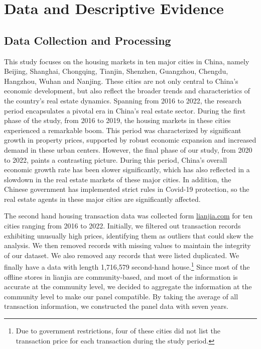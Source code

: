 \documentclass[12pt]{article}
\begin{document}


\section{Data and Descriptive Evidence \label{sec:data}}

\subsection{Data Collection and Processing} \label{subsec:data_collection}

This study focuses on the housing markets in ten major cities in China, namely Beijing, Shanghai, Chongqing, Tianjin, Shenzhen, Guangzhou, Chengdu, Hangzhou, Wuhan and Nanjing. These cities are not only central to China's economic development, but also reflect the broader trends and characteristics of the country's real estate dynamics. Spanning from 2016 to 2022, the research period encapsulates a pivotal era in China's real estate sector. During the first phase of the study, from 2016 to 2019, the housing markets in these cities experienced a remarkable boom. This period was characterized by significant growth in property prices, supported by robust economic expansion and increased demand in these urban centers. However, the final phase of our study, from 2020 to 2022, paints a contrasting picture. During this period, China's overall economic growth rate has been slower significantly, which has also reflected in a slowdown in the real estate markets of these major cities. In addition, the Chinese government has implemented strict rules in Covid-19 protection, so the real estate agents in these major cities are significantly affected.

The second hand housing transaction data was collected form \href{https://bj.lianjia.com/}{lianjia.com} for ten cities ranging from 2016 to 2022. Initially, we filtered out transaction records exhibiting unusually high prices, identifying them as outliers that could skew the analysis. We then removed records with missing values to maintain the integrity of our dataset. We also removed any records that were listed duplicated. We finally have a data with length 1,716,579 second-hand house.\footnote{Due to government restrictions, four of these cities did not list the transaction price for each transaction during the study period.} Since most of the offline stores in lianjia are community-based, and most of the information is accurate at the community level, we decided to aggregate the information at the community level to make our panel compatible. By taking the average of all transaction information, we constructed the panel data with seven years.
\end{document}
